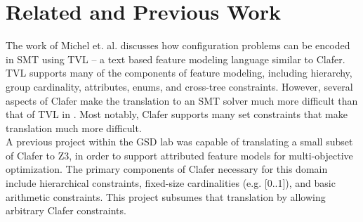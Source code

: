 \documentclass{article}
\begin{document}
\section{Related and Previous Work}
The work of Michel et. al. \cite{Michel2012} discusses how configuration problems can be encoded in SMT using TVL \cite{Classen2011} -- a text based feature modeling language similar to Clafer. TVL supports many of the components of feature modeling, including hierarchy, group cardinality, attributes, enums, and cross-tree constraints. However, several aspects of Clafer make the translation to an SMT solver much more difficult than that of TVL in \cite{Michel2012}. Most notably, Clafer supports many set constraints that make translation much more difficult. \\
\indent  A previous project \cite{Olaechea2013} within the GSD lab was capable of translating a small subset of Clafer to Z3, in order to support attributed feature models for multi-objective optimization. The primary components of Clafer necessary for this domain include hierarchical constraints, fixed-size cardinalities (e.g. [0..1]), and basic arithmetic constraints. This project subsumes that translation by allowing arbitrary Clafer constraints.
\end{document}
